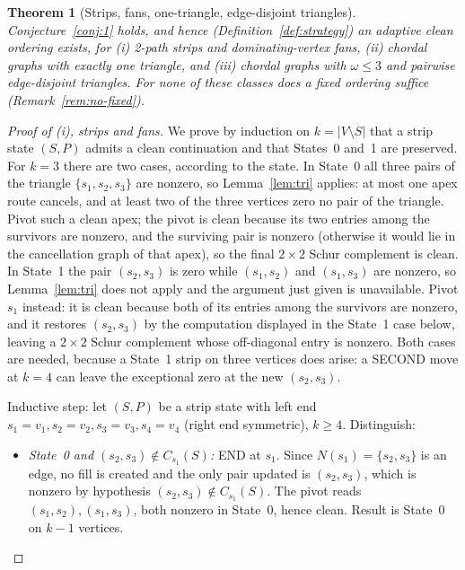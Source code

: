 \documentclass[11pt]{article}
\theoremstyle{plain}
\newtheorem{theorem}{Theorem}[section]
\theoremstyle{definition}
\theoremstyle{remark}
\begin{document}
\begin{aiblock}
\begin{theorem}[Strips, fans, one-triangle, edge-disjoint triangles]\label{thm:positives}
Conjecture~\ref{conj:1} holds, and hence (Definition~\ref{def:strategy}) an adaptive clean ordering exists, for (i) 2-path strips and dominating-vertex fans, (ii) chordal graphs with exactly one triangle, and (iii) chordal graphs with $\omega\le3$ and pairwise edge-disjoint triangles. For none of these classes does a fixed ordering suffice (Remark~\ref{rem:no-fixed}).
\end{theorem}
\begin{proof}[Proof of (i), strips and fans]
We prove by induction on $k=|V\setminus S|$ that a strip state $(S,P)$ admits a clean continuation and that States~0 and~1 are preserved. For $k=3$ there are two cases, according to the state. In State~0 all three pairs of the triangle
$\{s_1,s_2,s_3\}$ are nonzero, so Lemma~\ref{lem:tri} applies: at most one apex route cancels, and at
least two of the three vertices zero no pair of the triangle. Pivot such a clean apex; the pivot is
clean because its two entries among the survivors are nonzero, and the surviving pair is nonzero
(otherwise it would lie in the cancellation graph of that apex), so the final $2\times2$ Schur
complement is clean. In State~1 the pair $(s_2,s_3)$ is zero while $(s_1,s_2)$ and $(s_1,s_3)$ are
nonzero, so Lemma~\ref{lem:tri} does not apply and the argument just given is unavailable. Pivot
$s_1$ instead: it is clean because both of its entries among the survivors are nonzero, and it
restores $(s_2,s_3)$ by the computation displayed in the State~1 case below, leaving a $2\times2$
Schur complement whose off-diagonal entry is nonzero. Both cases are needed, because a State~1 strip
on three vertices does arise: a SECOND move at $k=4$ can leave the exceptional zero at the new
$(s_2,s_3)$.

Inductive step: let $(S,P)$ be a strip state with left end $s_1=v_1,s_2=v_2,s_3=v_3,s_4=v_4$ (right end symmetric), $k\ge4$. Distinguish:

\begin{itemize}
\item \emph{State~0 and $(s_2,s_3)\notin C_{s_1}(S)$:} END at $s_1$. Since $N(s_1)=\{s_2,s_3\}$ is an edge, no fill is created and the only pair updated is $(s_2,s_3)$, which is nonzero by hypothesis $(s_2,s_3)\notin C_{s_1}(S)$. The pivot reads $(s_1,s_2),(s_1,s_3)$, both nonzero in State~0, hence clean. Result is State~0 on $k-1$ vertices.


\end{itemize}
\end{proof}
\end{aiblock}
\end{document}
